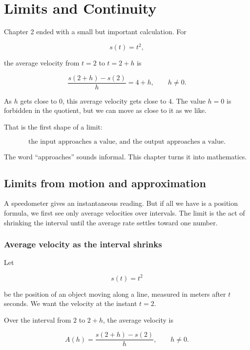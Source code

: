 
\chapter{Limits and Continuity}
\label{chap:limits-continuity}

Chapter 2 ended with a small but important calculation.  For

\[
s(t)=t^2,
\]

the average velocity from \(t=2\) to \(t=2+h\) is

\[
\frac{s(2+h)-s(2)}{h}=4+h,
\qquad h\neq0.
\]

As \(h\) gets close to \(0\), this average velocity gets close to \(4\).  The value \(h=0\) is forbidden in the quotient, but we can move as close to it as we like.

That is the first shape of a limit:

\[
\text{the input approaches a value, and the output approaches a value.}
\]

The word ``approaches'' sounds informal.  This chapter turns it into mathematics.

\section{Limits from motion and approximation}
\label{sec:limits-motion-approximation}

A speedometer gives an instantaneous reading.  But if all we have is a position formula, we first see only average velocities over intervals.  The limit is the act of shrinking the interval until the average rate settles toward one number.

\subsection{Average velocity as the interval shrinks}
\label{subsec:average-velocity-shrinks}

Let

\[
s(t)=t^2
\]

be the position of an object moving along a line, measured in meters after \(t\) seconds.  We want the velocity at the instant \(t=2\).

Over the interval from \(2\) to \(2+h\), the average velocity is

\[
A(h)=\frac{s(2+h)-s(2)}{h},
\qquad h\neq0.
\]

